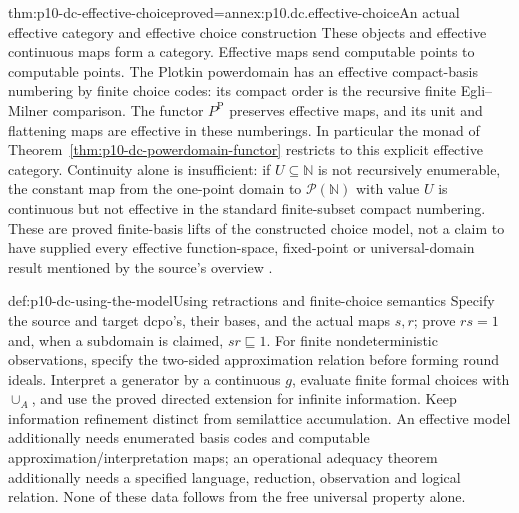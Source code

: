 \begin{hbtheorem}{thm:p10-dc-effective-choice}{proved=annex:p10.dc.effective-choice}{An actual effective category and effective choice construction}
These objects and effective continuous maps form a category. Effective
maps send computable points to computable points. The Plotkin powerdomain
has an effective compact-basis numbering by finite choice codes:
its compact order is the recursive finite Egli--Milner comparison.
The functor \(P^{\mathrm P}\) preserves effective maps, and its unit
and flattening maps are effective in these numberings. In particular the
monad of Theorem~\ref{thm:p10-dc-powerdomain-functor} restricts to this
explicit effective category.
Continuity alone is insufficient: if \(U\subseteq\mathbb N\) is
not recursively enumerable, the constant map from the one-point domain
to \(\mathcal P(\mathbb N)\) with value \(U\) is continuous but not
effective in the standard finite-subset compact numbering.
These are proved finite-basis lifts of the constructed choice model,
not a claim to have supplied every effective function-space, fixed-point
or universal-domain result mentioned by the source's overview
\cite[pp.~94,145]{AbramskyJungCorrectedExpandedDomainTheory}.
\end{hbtheorem}

\begin{hbmethod}{def:p10-dc-using-the-model}{Using retractions and finite-choice semantics}
Specify the source and target dcpo's, their bases, and the actual maps
\(s,r\); prove \(rs=1\) and, when a subdomain is claimed,
\(sr\sqsubseteq1\). For finite nondeterministic observations, specify
the two-sided approximation relation before forming round ideals.
Interpret a generator by a continuous \(g\), evaluate finite formal
choices with \(\cup_A\), and use the proved directed extension for
infinite information. Keep information refinement distinct from
semilattice accumulation. An effective model additionally needs
enumerated basis codes and computable approximation/interpretation maps;
an operational adequacy theorem additionally needs a specified language,
reduction, observation and logical relation. None of these data follows
from the free universal property alone.
\end{hbmethod}

